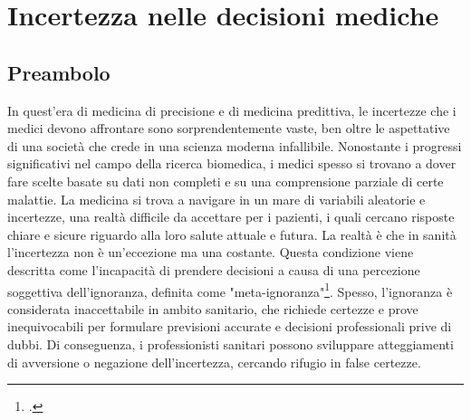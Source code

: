 \chapter{Incertezza nelle decisioni mediche}
\label{cap:incertezza-decisioni-mediche}


\section{Preambolo}
In quest'era di medicina di precisione e di medicina predittiva, le incertezze che i medici devono affrontare sono sorprendentemente vaste, ben oltre le aspettative di una società che crede in una scienza moderna infallibile. Nonostante i progressi significativi nel campo della ricerca biomedica, i medici spesso si trovano a dover fare scelte basate su dati non completi e su una comprensione parziale di certe malattie. La medicina si trova a navigare in un mare di variabili aleatorie e incertezze, una realtà difficile da accettare per i pazienti, i quali cercano risposte chiare e sicure riguardo alla loro salute attuale e futura.
La realtà è che in sanità l'incertezza non è un'eccezione ma una costante. Questa condizione viene descritta come l'incapacità di prendere decisioni a causa di una percezione soggettiva dell'ignoranza, definita come "meta-ignoranza"\footcite{womak:meta-ignoranza}. Spesso, l'ignoranza è considerata inaccettabile in ambito sanitario, che richiede certezze e prove inequivocabili per formulare previsioni accurate e decisioni professionali prive di dubbi. Di conseguenza, i professionisti sanitari possono sviluppare atteggiamenti di avversione o negazione dell'incertezza, cercando rifugio in false certezze.\\

